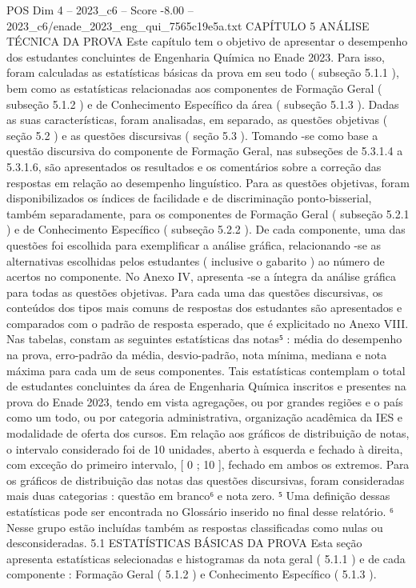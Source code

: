 \begin{textsample}{POS Dim 4 – 2023\_c6 – Score -8.00 – 2023\_c6/enade\_2023\_eng\_qui\_7565c19e5a.txt}  \label{ex:f4_pos_343}
CAPÍTULO 5 ANÁLISE TÉCNICA DA PROVA Este capítulo tem o objetivo de apresentar o desempenho dos estudantes concluintes de Engenharia Química no Enade 2023.
Para isso, foram calculadas as estatísticas básicas da prova em seu todo ( subseção 5.1.1 ), bem como as estatísticas relacionadas aos componentes de Formação Geral ( subseção 5.1.2 ) e de Conhecimento Específico da área ( subseção 5.1.3 ).
Dadas as suas características, foram analisadas, em separado, as questões objetivas ( seção 5.2 ) e as questões discursivas ( seção 5.3 ).
Tomando -se como base a questão discursiva do componente de Formação Geral, nas subseções de 5.3.1.4 a 5.3.1.6, são apresentados os resultados e os comentários sobre a correção das respostas em relação ao desempenho linguístico.
Para as questões objetivas, foram disponibilizados os índices de facilidade e de discriminação ponto-bisserial, também separadamente, para os componentes de Formação Geral ( subseção 5.2.1 ) e de Conhecimento Específico ( subseção 5.2.2 ).
De cada componente, uma das questões foi escolhida para exemplificar a análise gráfica, relacionando -se as alternativas escolhidas pelos estudantes ( inclusive o gabarito ) ao número de acertos no componente.
No Anexo IV, apresenta -se a íntegra da análise gráfica para todas as questões objetivas.
Para cada uma das questões discursivas, os conteúdos dos tipos mais comuns de respostas dos estudantes são apresentados e comparados com o padrão de resposta esperado, que é explicitado no Anexo VIII.
Nas tabelas, constam as seguintes estatísticas das notas⁵ : média do desempenho na prova, erro-padrão da média, desvio-padrão, nota mínima, mediana e nota máxima para cada um de seus componentes.
Tais estatísticas contemplam o total de estudantes concluintes da área de Engenharia Química inscritos e presentes na prova do Enade 2023, tendo em vista agregações, ou por grandes regiões e o país como um todo, ou por categoria administrativa, organização acadêmica da IES e modalidade de oferta dos cursos.
Em relação aos gráficos de distribuição de notas, o intervalo considerado foi de 10 unidades, aberto à esquerda e fechado à direita, com exceção do primeiro intervalo, [ 0 ; 10 ], fechado em ambos os extremos.
Para os gráficos de distribuição das notas das questões discursivas, foram consideradas mais duas categorias : questão em branco⁶ e nota zero. ⁵ Uma definição dessas estatísticas pode ser encontrada no Glossário inserido no final desse relatório. ⁶ Nesse grupo estão incluídas também as respostas classificadas como nulas ou desconsideradas. 5.1 ESTATÍSTICAS BÁSICAS DA PROVA Esta seção apresenta estatísticas selecionadas e histogramas da nota geral ( 5.1.1 ) e de cada componente : Formação Geral ( 5.1.2 ) e Conhecimento Específico ( 5.1.3 ).

\end{textsample}
